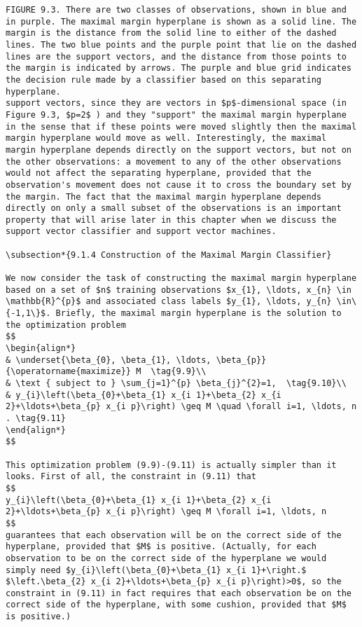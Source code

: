 \documentclass[10pt]{article}
\begin{document}
\begin{verbatim}
FIGURE 9.3. There are two classes of observations, shown in blue and in purple. The maximal margin hyperplane is shown as a solid line. The margin is the distance from the solid line to either of the dashed lines. The two blue points and the purple point that lie on the dashed lines are the support vectors, and the distance from those points to the margin is indicated by arrows. The purple and blue grid indicates the decision rule made by a classifier based on this separating hyperplane.
support vectors, since they are vectors in $p$-dimensional space (in Figure 9.3, $p=2$ ) and they "support" the maximal margin hyperplane in the sense that if these points were moved slightly then the maximal margin hyperplane would move as well. Interestingly, the maximal margin hyperplane depends directly on the support vectors, but not on the other observations: a movement to any of the other observations would not affect the separating hyperplane, provided that the observation's movement does not cause it to cross the boundary set by the margin. The fact that the maximal margin hyperplane depends directly on only a small subset of the observations is an important property that will arise later in this chapter when we discuss the support vector classifier and support vector machines.

\subsection*{9.1.4 Construction of the Maximal Margin Classifier}

We now consider the task of constructing the maximal margin hyperplane based on a set of $n$ training observations $x_{1}, \ldots, x_{n} \in \mathbb{R}^{p}$ and associated class labels $y_{1}, \ldots, y_{n} \in\{-1,1\}$. Briefly, the maximal margin hyperplane is the solution to the optimization problem
$$
\begin{align*}
& \underset{\beta_{0}, \beta_{1}, \ldots, \beta_{p}}{\operatorname{maximize}} M  \tag{9.9}\\
& \text { subject to } \sum_{j=1}^{p} \beta_{j}^{2}=1,  \tag{9.10}\\
& y_{i}\left(\beta_{0}+\beta_{1} x_{i 1}+\beta_{2} x_{i 2}+\ldots+\beta_{p} x_{i p}\right) \geq M \quad \forall i=1, \ldots, n . \tag{9.11}
\end{align*}
$$

This optimization problem (9.9)-(9.11) is actually simpler than it looks. First of all, the constraint in (9.11) that
$$
y_{i}\left(\beta_{0}+\beta_{1} x_{i 1}+\beta_{2} x_{i 2}+\ldots+\beta_{p} x_{i p}\right) \geq M \forall i=1, \ldots, n
$$
guarantees that each observation will be on the correct side of the hyperplane, provided that $M$ is positive. (Actually, for each observation to be on the correct side of the hyperplane we would simply need $y_{i}\left(\beta_{0}+\beta_{1} x_{i 1}+\right.$ $\left.\beta_{2} x_{i 2}+\ldots+\beta_{p} x_{i p}\right)>0$, so the constraint in (9.11) in fact requires that each observation be on the correct side of the hyperplane, with some cushion, provided that $M$ is positive.)


\end{verbatim}
\end{document}
